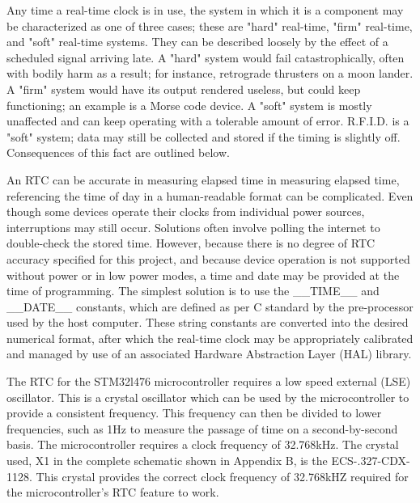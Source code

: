 Any time a real-time clock is in use, the system in which it is a component may be characterized as one of three cases; these are "hard" real-time, "firm" real-time, and "soft" real-time systems. They can be described loosely by the effect of a scheduled signal arriving late. A "hard" system would fail catastrophically, often with bodily harm as a result; for instance, retrograde thrusters on a moon lander. A "firm" system would have its output rendered useless, but could keep functioning; an example is a Morse code device. A "soft" system is mostly unaffected and can keep operating with a tolerable amount of error. R.F.I.D. is a "soft" system; data may still be collected and stored if the timing is slightly off. Consequences of this fact are outlined below.
\par


An RTC can be accurate in measuring elapsed time in measuring elapsed time, referencing the time of day in a human-readable format can be complicated. Even though some devices operate their clocks from individual power sources, interruptions may still occur. Solutions often involve polling the internet to double-check the stored time. However, because there is no degree of RTC accuracy specified for this project, and because device operation is not supported without power or in low power modes, a time and date may be provided at the time of programming. The simplest solution is to use the \_\_TIME\_\_ and \_\_DATE\_\_ constants, which are defined as per C standard by the pre-processor used by the host computer. These string constants are converted into the desired numerical format, after which the real-time clock may be appropriately calibrated and managed by use of an associated Hardware Abstraction Layer (HAL) library.
\par

The RTC for the STM32l476 microcontroller requires a low speed external (LSE) oscillator. This is a crystal oscillator which can be used by the microcontroller to provide a consistent frequency. This frequency can then be divided to lower frequencies, such as 1Hz to measure the passage of time on a second-by-second basis. The microcontroller requires a clock frequency of 32.768kHz. The crystal used, X1 in the complete schematic shown in Appendix B, is the ECS-.327-CDX-1128. This crystal provides the correct clock frequency of 32.768kHZ required for the microcontroller's RTC feature to work.

